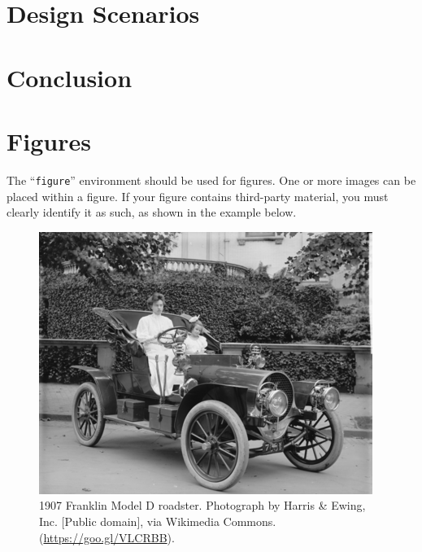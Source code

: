 \documentclass[acmtog]{acmart}
\begin{document}

\section{Design Scenarios}


\section{Conclusion}

\section{Figures}

The ``\verb|figure|'' environment should be used for figures. One or
more images can be placed within a figure. If your figure contains
third-party material, you must clearly identify it as such, as shown
in the example below.
\begin{figure}[h]
  \centering
  \includegraphics[width=\linewidth]{sample-franklin}
  \caption{1907 Franklin Model D roadster. Photograph by Harris \&
    Ewing, Inc. [Public domain], via Wikimedia
    Commons. (\url{https://goo.gl/VLCRBB}).}
\end{figure}
\end{document}
